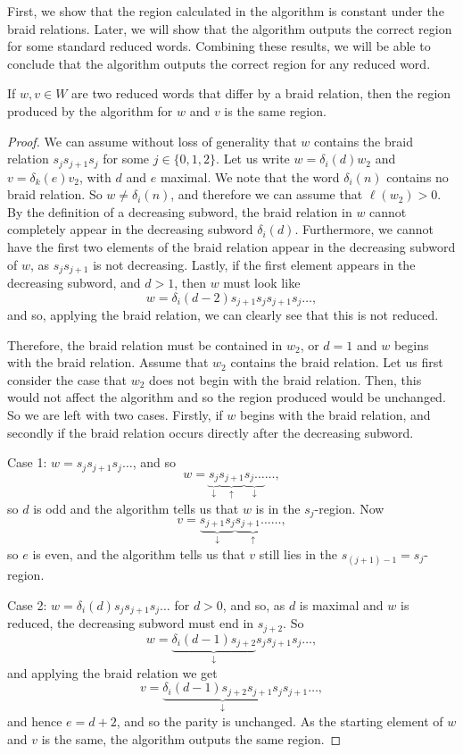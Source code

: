 \documentclass[11pt]{article}
\begin{document}
First, we show that the region calculated in the algorithm is constant under the braid relations. Later, we will show that the algorithm outputs the correct region for some standard reduced words. Combining these results, we will be able to conclude  that the algorithm outputs the correct region for any reduced word.

\begin{proposition}\label{regions}
    If $w,v\in W$ are two reduced words that differ by a braid relation, then the region produced by the algorithm for $w$ and $v$ is the same region. 
\end{proposition}
\begin{proof}
    We can assume without loss of generality that $w$ contains the braid relation $s_js_{j+1}s_j$ for some $j\in\{0,1,2\}$.
    Let us write $w=\delta_i(d)w_2$ and $v=\delta_k(e)v_2$, with $d$ and $e$ maximal. We note that the word $\delta_i(n)$ contains no braid relation. So  $w\neq \delta_i(n)$, and therefore we can assume that $\ell(w_2)>0$. By the definition of a decreasing subword, the braid relation in $w$ cannot completely appear in the decreasing subword $\delta_i(d)$. Furthermore, we cannot have the first two elements of the braid relation appear in the decreasing subword of $w$, as $s_js_{j+1}$ is not decreasing. Lastly, if the first element appears in the decreasing subword, and $d>1$, then $w$ must look like 
    \[w=\delta_i(d-2)s_{j+1}s_js_{j+1}s_j\hdots,\]
    and so, applying the braid relation, we can clearly see that this is not reduced. 
    
     Therefore, the braid relation must be contained in $w_2$, or $d=1$ and $w$ begins with the braid relation. Assume that $w_2$ contains the braid relation. Let us first consider the case that $w_2$ does not begin with the braid relation. Then, this would not affect the algorithm and so the region produced would be unchanged. So we are left with two cases. Firstly, if $w$ begins with the braid relation, and secondly if the braid relation occurs directly after the decreasing subword.

    Case 1: $w=s_js_{j+1}s_j\hdots$, and so 
\[w=\underbrace{s_j}_\downarrow\underbrace{s_{j+1}}_\uparrow\underbrace{s_j\hdots}_\downarrow\hdots,\]
    so $d$ is odd and the algorithm tells us that $w$ is in the $s_j$-region.
    Now 
    \[v=\underbrace{s_{j+1}s_j}_\downarrow\underbrace{s_{j+1}\hdots}_\uparrow\hdots,\]
    so $e$ is even, and the algorithm tells us that $v$ still lies in the $s_{(j+1)-1}=s_j$-region. 

    Case 2: $w=\delta_i(d)s_js_{j+1}s_j\hdots$ for $d>0$, and so, as $d$ is maximal and $w$ is reduced, the decreasing subword must end in $s_{j+2}$. So
    \[w=\underbrace{\delta_i(d-1)s_{j+2}}_\downarrow s_js_{j+1}s_j\hdots,\]
    and applying the braid relation we get
    \[v=\underbrace{\delta_i(d-1)s_{j+2}s_{j+1}s_j}_\downarrow s_{j+1}\hdots,\]
    and hence $e=d+2$, and so the parity is unchanged. As the starting element of $w$ and $v$ is the same, the algorithm outputs the same region.
\end{proof}
\end{document}
